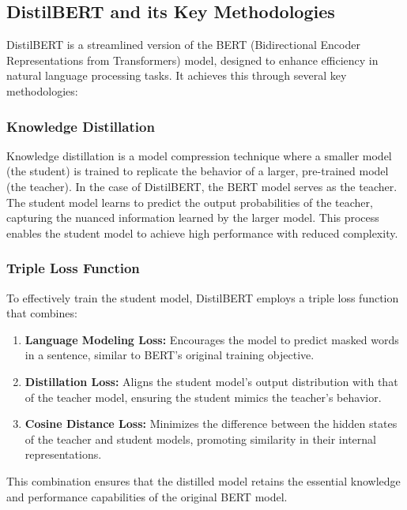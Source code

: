 \subsection{DistilBERT and its Key Methodologies}
DistilBERT is a streamlined version of the BERT (Bidirectional Encoder Representations from Transformers) model, designed to enhance efficiency in natural language processing tasks. It achieves this through several key methodologies:
\subsubsection{Knowledge Distillation}
Knowledge distillation is a model compression technique where a smaller model (the student) is trained to replicate the behavior of a larger, pre-trained model (the teacher). In the case of DistilBERT, the BERT model serves as the teacher. The student model learns to predict the output probabilities of the teacher, capturing the nuanced information learned by the larger model. This process enables the student model to achieve high performance with reduced complexity.

\subsubsection{Triple Loss Function}
To effectively train the student model, DistilBERT employs a triple loss function that combines:
\begin{enumerate}
    \item \textbf{Language Modeling Loss:} Encourages the model to predict masked words in a sentence, similar to BERT's original training objective.
    \item \textbf{Distillation Loss:} Aligns the student model's output distribution with that of the teacher model, ensuring the student mimics the teacher's behavior.
    \item \textbf{Cosine Distance Loss:} Minimizes the difference between the hidden states of the teacher and student models, promoting similarity in their internal representations.
\end{enumerate}

This combination ensures that the distilled model retains the essential knowledge and performance capabilities of the original BERT model.

